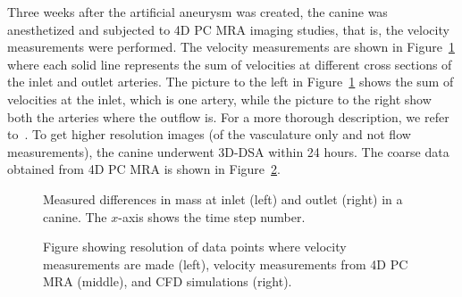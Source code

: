 Three weeks after the artificial aneurysm was created, the canine was
anesthetized and subjected to 4D PC MRA imaging studies, that is, the
velocity measurements were performed. The velocity measurements are
shown in Figure~\ref{fig:mass_dog} where each solid line represents
the sum of velocities at different cross sections of the inlet and
outlet arteries. The picture to the left in Figure~\ref{fig:mass_dog}
shows the sum of velocities at the inlet, which is one artery, while
the picture to the right show both the arteries where the outflow
is. For a more thorough description, we refer to~\cite{JiangJohnsonValen-SendstadEtAl2010}. To get
higher resolution images (of the vasculature only and not flow
measurements), the canine underwent 3D-DSA within 24 hours. The coarse
data obtained from 4D PC MRA is shown in Figure~\ref{fig:dog_mri}.

\begin{figure}
  \begin{center}
  \end{center}
  \caption{Measured differences in mass at inlet (left) and outlet
    (right) in a canine. The $x$-axis shows the time step number.}
  \label{fig:mass_dog}
\end{figure}

\begin{figure}
  \begin{center}
  \end{center}
  \caption{Figure showing resolution of data points where velocity
    measurements are made (left), velocity measurements from 4D PC MRA
    (middle), and CFD simulations (right).}
  \label{fig:dog_mri}
\end{figure}

